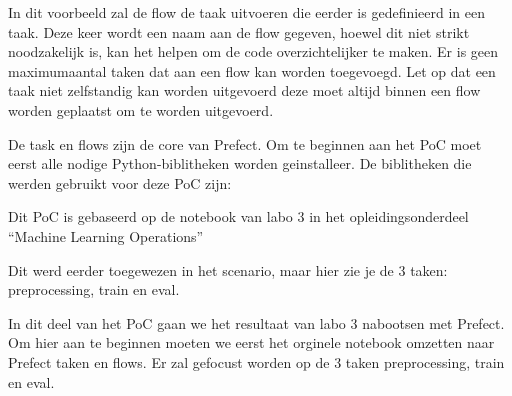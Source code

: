 
In dit voorbeeld zal de flow de taak uitvoeren die eerder is gedefinieerd in een taak. Deze keer wordt een naam aan de flow gegeven, hoewel dit niet strikt noodzakelijk is, kan het helpen om de code overzichtelijker te maken. Er is geen maximumaantal taken dat aan een flow kan worden toegevoegd. Let op dat een taak niet zelfstandig kan worden uitgevoerd deze moet altijd binnen een flow worden geplaatst om te worden uitgevoerd.

De task en flows zijn de core van Prefect. Om te beginnen aan het PoC moet eerst alle nodige Python-biblitheken worden geinstalleer.
De biblitheken die werden gebruikt voor deze PoC zijn:



Dit PoC is gebaseerd op de notebook van labo 3 in het opleidingsonderdeel ``Machine Learning Operations''


Dit werd eerder toegewezen in het scenario, maar hier zie je de 3 taken: preprocessing, train en eval.

In dit deel van het PoC gaan we het resultaat van labo 3 nabootsen met Prefect.
Om hier aan te beginnen moeten we eerst het orginele notebook omzetten naar Prefect taken en flows. Er zal gefocust worden op de 3 taken preprocessing, train en eval.


